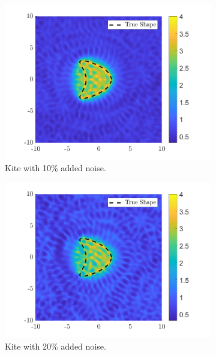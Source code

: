 \documentclass[]{article}
\begin{document}
			\begin{figure}[h]
				\centering
				\begin{subfigure}{.3\textwidth}
					\centering
					\includegraphics[width = \textwidth]{Numeric Simulations/Images/kite-10-noise-reconstructed}
					\caption{Kite with 10\% added noise.}
				\end{subfigure}
				\begin{subfigure}{.3\textwidth}
					\centering
					\includegraphics[width = \textwidth]{Numeric Simulations/Images/kite-20-noise-reconstructed}
					\caption{Kite with 20\% added noise.}
				\end{subfigure}
				\begin{subfigure}{.3\textwidth}
					\centering

\end{subfigure}
\end{figure}
\end{document}
